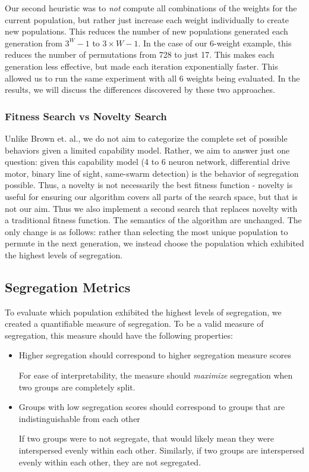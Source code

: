 Our second heuristic was to \emph{not} compute all combinations of the weights for the current population, but rather just increase each weight individually to create new populations. 
This reduces the number of new populations generated each generation from $3^W - 1$ to $3 \times W - 1$. 
In the case of our 6-weight example, this reduces the number of permutations from 728 to just 17. 
This makes each generation less effective, but made each iteration exponentially faster. 
This allowed us to run the same experiment with all 6 weights being evaluated. 
In the results, we will discuss the differences discovered by these two approaches.


\subsubsection{Fitness Search vs Novelty Search}

Unlike Brown et. al., we do not aim to categorize the complete set of possible behaviors given a limited capability model. 
Rather, we aim to answer just one question: given this capability model (4 to 6 neuron network, differential drive motor, binary line of sight, same-swarm detection) is the behavior of segregation possible. 
Thus, a novelty is not necessarily the best fitness function - novelty is useful for ensuring our algorithm covers all parts of the search space, but that is not our aim. 
Thus we also implement a second search that replaces novelty with a traditional fitness function.
The semantics of the algorithm are unchanged. 
The only change is as follows: rather than selecting the most unique population to permute in the next generation, we instead choose the population which exhibited the highest levels of segregation.


\subsection{Segregation Metrics}

To evaluate which population exhibited the highest levels of segregation, we created a quantifiable measure of segregation. 
To be a valid measure of segregation, this measure should have the following properties: 
\begin{itemize}
    \item Higher segregation should correspond to higher segregation measure scores

        For ease of interpretability, the measure should \emph{maximize} segregation when two groups are completely split.

    \item Groups with low segregation scores should correspond to groups that are indistinguishable from each other

        If two groups were to not segregate, that would likely mean they were interspersed evenly within each other. 
        Similarly, if two groups are interspersed evenly within each other, they are not segregated. 

\end{itemize}

